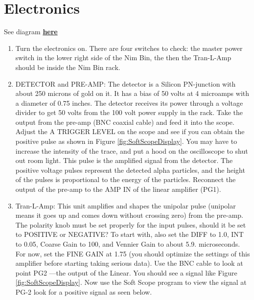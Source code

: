 \documentclass{../lab}
\begin{document}
\section{Electronics}

See diagram \href{http://physics111.lib.berkeley.edu/Physics111/Reprints/RUT/RUT_Positive-diagram.JPG}{\textbf{here}}

\begin{enumerate}
    \item Turn the electronics on. There are four switches to check: the master power switch in the lower right side of the Nim Bin, the then the Tran-L-Amp should be inside the Nim Bin rack.

    \item DETECTOR and PRE-AMP: The detector is a Silicon PN-junction with about 250 microns of gold on it. It has a bias of 50 volts at 4 microamps with a diameter of 0.75 inches. The detector receives its power through a voltage divider to get 50 volts from the 100 volt power supply in the rack. Take the output from the pre-amp (BNC coaxial cable) and feed it into the scope. Adjust the A TRIGGER LEVEL on the scope and see if you can obtain the positive pulse as shown in Figure \ref{fig:SoftScopeDisplay}. You may have to increase the intensity of the trace, and put a hood on the oscilloscope to shut out room light. This pulse is the amplified signal from the detector. The positive voltage pulses represent the detected alpha particles, and the height of the pulses is proportional to the energy of the particles. Reconnect the output of the pre-amp to the AMP IN of the linear amplifier (PG1).

    \item Tran-L-Amp: This unit amplifies and shapes the unipolar pulse (unipolar means it goes up and comes down without crossing zero) from the pre-amp. The polarity knob must be set properly for the input pulses, should it be set to POSITIVE or NEGATIVE? To start with, also set the DIFF to 1.0, INT to 0.05, Coarse Gain to 100, and Vennier Gain to about 5.9. microseconds. For now, set the FINE GAIN at 1.75 (you should optimize the settings of this amplifier before starting taking serious data). Use the BNC cable to look at point PG2 ---the output of the Linear. You should see a signal like Figure \ref{fig:SoftScopeDisplay}. Now use the Soft Scope program to view the signal at PG-2 look for a positive signal as seen below.

\end{enumerate}
\end{document}
